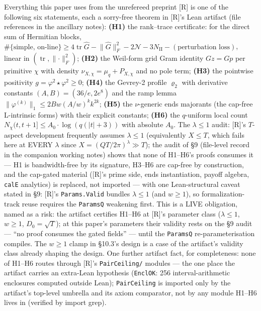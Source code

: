 \documentclass[11pt]{amsart}
\newcommand{\tr}{\operatorname{tr}}
\theoremstyle{plain}
\theoremstyle{remark}
\begin{document}
Everything this paper uses from the unrefereed preprint [R] is one of the following
six statements, each a sorry-free theorem in [R]'s Lean artifact (file references in
the ancillary notes): \textbf{(H1)} the rank--trace certificate: for the direct sum of
Hermitian blocks, $\#\{\text{simple, on-line}\} \ge 4 \tr \widehat{G} -
\lVert\widehat{G}\rVert^2_F - 2\mathcal{N} - 3N_{\mathrm{II}} -
(\text{perturbation loss})$, linear in $(\tr, \lVert\cdot\rVert^2_F)$; \textbf{(H2)}
the Weil-form grid Gram identity $Gz = Gp$ per primitive $\chi$ with density
$\nu_{X,\chi} = \mu_q + P_{X,\chi}$ and no pole term; \textbf{(H3)} the pointwise
positivity $g = \varphi^2\star\varphi^2 \ge 0$; \textbf{(H4)} the Gevrey-2 profile
$\varrho_2$ with derivative constants $(A, B) = (36/e, 2e^{8})$ and the ramp lemma
$\lVert\varphi^{(k)}\rVert_1 \le 2Bw(A/w)^k k^{2k}$; \textbf{(H5)} the $\nu$-generic
ends majorants (the cap-free L-intrinsic forms) with their explicit constants;
\textbf{(H6)} the $q$-uniform local count $N_\chi(t, t+1] \le A_0\cdot\log(q(|t|+3))$
with absolute $A_0$. The $\lambda \le 1$ audit: [R]'s $T$-aspect development
frequently assumes $\lambda \le 1$ (equivalently $X \le T$, which fails here at EVERY
$\lambda$ since $X = (QT/2\pi)^\lambda \gg T$); the audit of \S9 (file-level record in
the companion working notes) shows that none of H1--H6's proofs consumes it --- H1 is
bandwidth-free by its signature, H3--H6 are cap-free by construction, and the
cap-gated material ([R]'s prime side, ends instantiation, payoff algebra,
\texttt{calE} analytics) is replaced, not imported --- with one Lean-structural caveat
stated in \S9: [R]'s \texttt{Params.Valid} bundles $\lambda \le 1$ (and $w \ge 1$), so
formalization-track reuse requires the \texttt{ParamsQ} weakening first. This is a
LIVE obligation, named as a risk: the artifact certifies H1--H6 at [R]'s parameter
class ($\lambda \le 1$, $w \ge 1$, $D_0 = \sqrt{T}$); at this paper's parameters their
validity rests on the \S9 audit --- ``no proof consumes the gated fields'' --- until
the \texttt{ParamsQ} re-parameterisation compiles. The $w \ge 1$ clamp in \S10.3's
design is a case of the artifact's validity class already shaping the design. One
further artifact fact, for completeness: none of H1--H6 routes through [R]'s
\texttt{PairCeiling/} modules --- the one place the artifact carries an extra-Lean
hypothesis (\texttt{EnclOK}: 256 interval-arithmetic enclosures computed outside
Lean); \texttt{PairCeiling} is imported only by the artifact's top-level umbrella and
its axiom comparator, not by any module H1--H6 lives in (verified by import grep).
\end{document}
